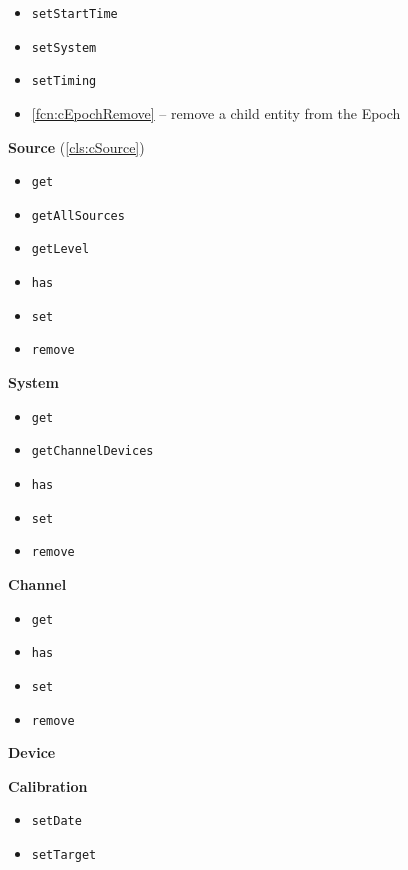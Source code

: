 \documentclass{aodatadocs}
\newcommand{\ret}[1]{\textcolor{purple5}{\texttt{#1}}}
\begin{document}
{\begin{legal}[font=\Large\bfseries, itemsep=1.5ex]
\begin{legal}[font=\large\bfseries, itemsep=1ex]
\begin{itemize}
            \item \ret{setStartTime}
            \item \ret{setSystem}
            \item \ret{setTiming}
            \item \ref{fcn:cEpochRemove} -- remove a child entity from the Epoch 
        \end{itemize}
        \item {\large\textbf{Source} (\ref{cls:cSource})}
            \begin{itemize}
                \item \ret{get}
                \item \ret{getAllSources}
                \item \ret{getLevel}
                \item \ret{has}
                \item \ret{set}
                \item \ret{remove}
            \end{itemize}
        \item {\large\textbf{System}}
            \begin{itemize}
                \item \ret{get}
                \item \ret{getChannelDevices}
                \item \ret{has}
                \item \ret{set}
                \item \ret{remove}
            \end{itemize}
        \item {\large\textbf{Channel}}
            \begin{itemize}
                \item \ret{get}
                \item \ret{has}
                \item \ret{set}
                \item \ret{remove}
            \end{itemize}
        \item {\large\textbf{Device}}
        \item {\large\textbf{Calibration}}
            \begin{itemize}
                \item \ret{setDate}
                \item \ret{setTarget}
            \end{itemize}

\end{legal}
\end{legal}}
\end{document}
